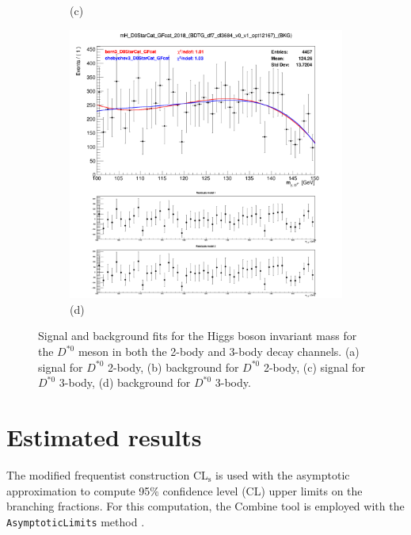 \begin{figure}[!ht]
\begin{subfigure}[t]{0.50\mylength}
        \caption{\footnotesize (c)}
    \end{subfigure}%
    \begin{subfigure}[t]{0.50\mylength}
        \centering
        \includegraphics[width=0.45\mylength]{resources/plots/D0Star_3body_fit_BKG.png}
        \caption{\footnotesize (d)}
    \end{subfigure}%
\caption{Signal and background fits for the Higgs boson invariant mass for the $D^{*0}$ meson in both the 2-body and 3-body decay channels. (a) signal for $D^{*0}$ 2-body, (b) background for $D^{*0}$ 2-body, (c) signal for $D^{*0}$ 3-body, (d) background for $D^{*0}$ 3-body.}
\label{fig:sig_bkg_modelling_d0star}
    \vspace*{-0.0cm}
\end{figure}

\section{Estimated results}\label{sec:results}

The modified frequentist construction CL$_\text{s}$ \cite{Read:2002hq, Junk:1999kv} is used with the asymptotic approximation \cite{Cowan:2010js} to compute 95\% confidence level (CL) upper limits on the branching fractions. For this computation, the Combine tool is employed with the \verb+AsymptoticLimits+ method \cite{CMS:Combine}.

